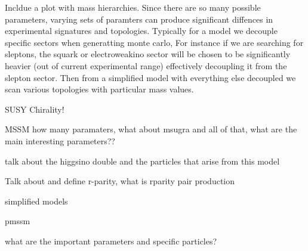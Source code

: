 Incldue a plot with mass hierarchies. Since there are so many possible parameters, varying sets of paramters can produce significant diffences in experimental signatures and topologies. Typically for a model we decouple specific sectors when generatting monte carlo, For instance if we are searching for sleptons, the squark or electroweakino sector will be chosen to be significantly heavier (out of current experimental range) effectively decoupling it from the slepton sector. Then from a simplified model with everything else decoupled we scan various topologies with particular mass values. 


SUSY Chirality!

MSSM how many paramaters, what about msugra and all of that, what are the main interesting parameters??


talk about the higgsino double and the particles that arise from this model

Talk about and define r-parity, what is rparity pair production


simplified models

pmssm

what are the important parameters and specific particles?
